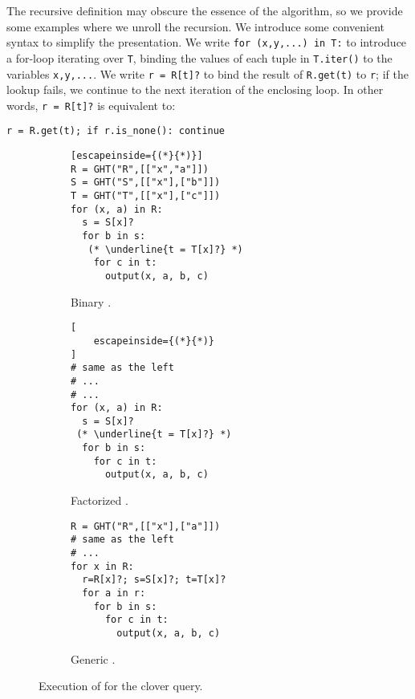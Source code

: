 The recursive definition may obscure the essence of the \FJ algorithm,
  so we provide some examples where we unroll the recursion.
We introduce some convenient syntax to simplify the presentation.
We write \lstinline|for (x,y,...) in T:| 
  to introduce a for-loop iterating over \lstinline|T|, 
  binding the values of each tuple in \lstinline|T.iter()| 
  to the variables \lstinline|x,y,...|.
We write \lstinline|r = R[t]?| to bind the result of 
  \lstinline|R.get(t)| to \lstinline|r|;
  if the lookup fails, we continue to the next iteration of the 
  enclosing loop.
In other words, \texttt{r = R[t]?} is equivalent to:
%
\begin{lstlisting}
r = R.get(t); if r.is_none(): continue
\end{lstlisting}

\begin{figure*}
  \begin{subfigure}[b]{0.3\linewidth}
\begin{lstlisting}[escapeinside={(*}{*)}]
R = GHT("R",[["x","a"]])
S = GHT("S",[["x"],["b"]])
T = GHT("T",[["x"],["c"]])
for (x, a) in R:
  s = S[x]?
  for b in s:
   (* \underline{t = T[x]?} *)
    for c in t:
      output(x, a, b, c)
\end{lstlisting}
    \caption{Binary \FJ.}
    \label{fig:bj-loop}
  \end{subfigure}
\hspace{1.5em}
  \begin{subfigure}[b]{0.3\linewidth}
    \centering
\begin{lstlisting}[
    escapeinside={(*}{*)}
]
# same as the left
# ...
# ...
for (x, a) in R:
  s = S[x]?
 (* \underline{t = T[x]?} *)
  for b in s:
    for c in t:
      output(x, a, b, c)
\end{lstlisting}
    \caption{Factorized \FJ.}
    \label{fig:factorized-loop}
  \end{subfigure}
  \hspace{.5em}
  \begin{subfigure}[b]{0.3\linewidth}
    \centering
\begin{lstlisting}
R = GHT("R",[["x"],["a"]])
# same as the left
# ...
for x in R:
  r=R[x]?; s=S[x]?; t=T[x]?
  for a in r:
    for b in s:
      for c in t:
        output(x, a, b, c)
\end{lstlisting}
    \caption{Generic \FJ.}
    \label{fig:gj-loop}
  \end{subfigure}
  \caption{Execution of \FJ for the clover query.}
\end{figure*}

